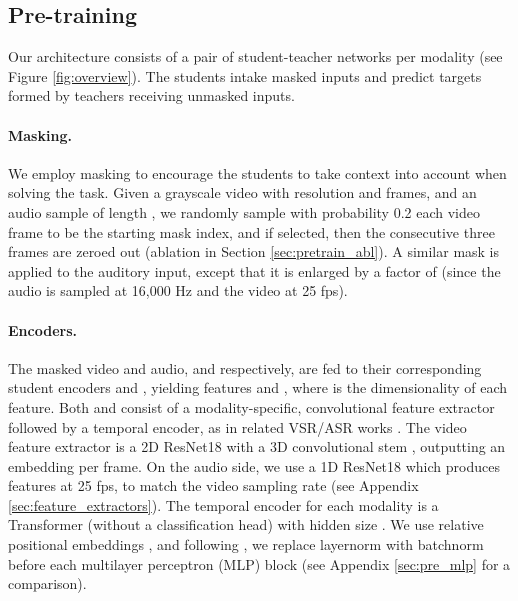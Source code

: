 \documentclass{article} \usepackage{iclr2023_conference,times}
\begin{document}
\subsection{Pre-training}

Our architecture consists of a pair of student-teacher networks per modality (see Figure \ref{fig:overview}). The students intake masked inputs and predict targets formed by teachers receiving unmasked inputs.

\paragraph{Masking.} We employ masking to encourage the students to take context into account when solving the task. Given a grayscale video  with resolution  and  frames, and an audio sample  of length , we randomly sample with probability 0.2 each video frame to be the starting mask index, and if selected, then the consecutive three frames are zeroed out (ablation in Section \ref{sec:pretrain_abl}). A similar mask is applied to the auditory input, except that it is enlarged by a factor of  (since the audio is sampled at 16,000 Hz and the video at 25 fps).

\paragraph{Encoders.} The masked video and audio,  and  respectively, are fed to their corresponding student encoders  and , yielding features  and , where  is the dimensionality of each feature. Both  and  consist of a modality-specific, convolutional feature extractor followed by a temporal encoder, as in related VSR/ASR works \citep{ma2022visual, baevski2020wav2vec}. The video feature extractor is a 2D ResNet18 \citep{he2016deep} with a 3D convolutional stem \citep{petridis2018audio}, outputting an embedding per frame. On the audio side, we use a 1D ResNet18 which produces features at 25 fps, to match the video sampling rate (see Appendix \ref{sec:feature_extractors}). The temporal encoder for each modality is a Transformer \citep{vaswani2017attention} (without a classification head) with hidden size . We use relative positional embeddings \citep{dai2019transformer}, and following \citet{chen2021empirical}, we replace layernorm \citep{ba2016layer} with batchnorm \citep{ioffe2015batch} before each multilayer perceptron (MLP) block (see Appendix \ref{sec:pre_mlp} for a comparison).
\end{document}
